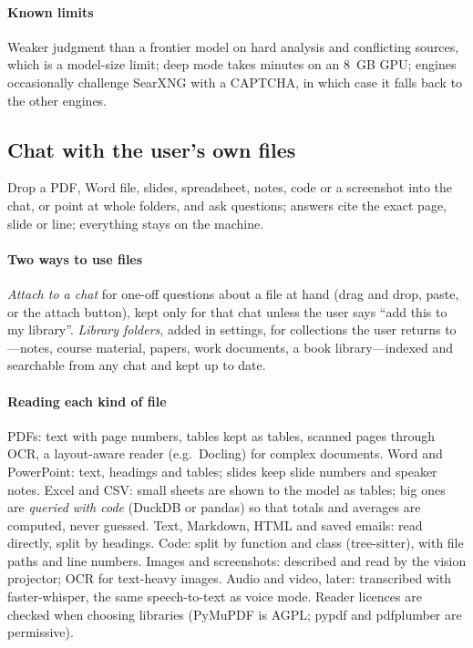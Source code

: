 \paragraph{Known limits} Weaker judgment than a frontier model on hard analysis and conflicting sources, which is a model-size limit; deep mode takes minutes on an 8~GB GPU; engines occasionally challenge SearXNG with a CAPTCHA, in which case it falls back to the other engines.

\subsection{Chat with the user's own files}

Drop a PDF, Word file, slides, spreadsheet, notes, code or a screenshot into the chat, or point \hivi{} at whole folders, and ask questions; answers cite the exact page, slide or line; everything stays on the machine.

\paragraph{Two ways to use files} \emph{Attach to a chat} for one-off questions about a file at hand (drag and drop, paste, or the attach button), kept only for that chat unless the user says ``add this to my library''. \emph{Library folders}, added in settings, for collections the user returns to---notes, course material, papers, work documents, a book library---indexed and searchable from any chat and kept up to date.

\paragraph{Reading each kind of file} PDFs: text with page numbers, tables kept as tables, scanned pages through OCR, a layout-aware reader (e.g.\ Docling) for complex documents. Word and PowerPoint: text, headings and tables; slides keep slide numbers and speaker notes. Excel and CSV: small sheets are shown to the model as tables; big ones are \emph{queried with code} (DuckDB or pandas) so that totals and averages are computed, never guessed. Text, Markdown, HTML and saved emails: read directly, split by headings. Code: split by function and class (tree-sitter), with file paths and line numbers. Images and screenshots: described and read by the vision projector; OCR for text-heavy images. Audio and video, later: transcribed with faster-whisper, the same speech-to-text as voice mode. Reader licences are checked when choosing libraries (PyMuPDF is AGPL; pypdf and pdfplumber are permissive).

